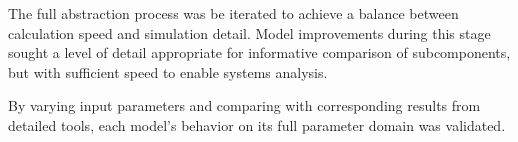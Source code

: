 
The full abstraction process was be iterated to achieve a balance between 
calculation speed and simulation detail. Model improvements during this stage 
sought a level of detail appropriate for informative comparison of subcomponents, but 
with sufficient speed to enable systems analysis. 


By varying input parameters and comparing with corresponding results from 
detailed tools, each model's behavior on its full parameter domain was 
validated.
